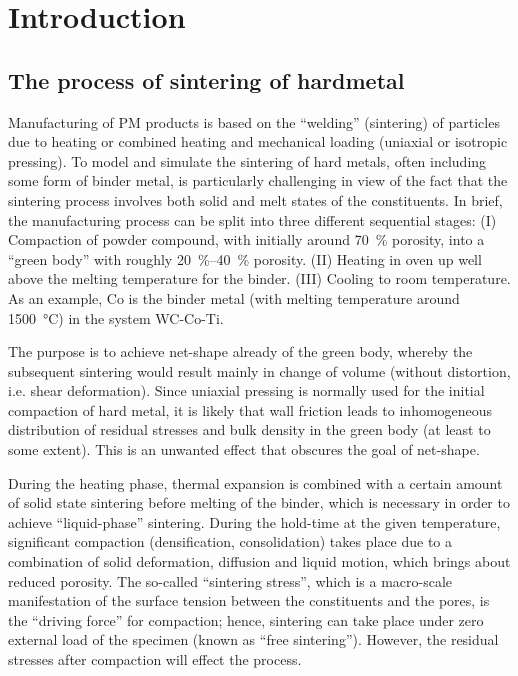 \documentclass[MikaelDissertation.tex]{subfiles}
\begin{document}
\chapter{Introduction}

\section{The process of sintering of hardmetal}

Manufacturing of PM products is based on the ``welding'' (sintering) of particles due to heating or combined heating and mechanical loading (uniaxial or isotropic pressing).
To model and simulate the sintering of hard metals, often including some form of binder metal, is particularly challenging in view of the fact that the sintering process involves both solid and melt states of the constituents.
In brief, the manufacturing process can be split into three different sequential stages:
(I) Compaction of powder compound, with initially around \SI{70}{\percent} porosity, into a ``green body'' with roughly \SIrange{20}{40}{\percent} porosity.
(II) Heating in oven up well above the melting temperature for the binder.
(III) Cooling to room temperature.
As an example, Co is the binder metal (with melting temperature around \SI{1500}{\celsius}) in the system WC-Co-Ti.

The purpose is to achieve net-shape already of the green body, whereby the subsequent sintering would result mainly in change of volume (without distortion, i.e. shear deformation).
Since uniaxial pressing is normally used for the initial compaction of hard metal, it is likely that wall friction leads to inhomogeneous
distribution of residual stresses and bulk density in the green body (at least to some extent).
This is an unwanted effect that obscures the goal of net-shape.

During the heating phase, thermal expansion is combined with a certain amount of solid state sintering before melting of the binder, which is necessary in order to achieve ``liquid-phase'' sintering.
During the hold-time at the given temperature, significant compaction (densification, consolidation) takes place due to a combination of solid deformation, diffusion and liquid motion, which brings about reduced porosity.
The so-called ``sintering stress'', which is a macro-scale manifestation of the surface tension between the constituents and the pores, is the ``driving force'' for compaction; hence, sintering can take place under zero external load of the specimen (known as ``free sintering'').
However, the residual stresses after compaction will effect the process.
\end{document}
